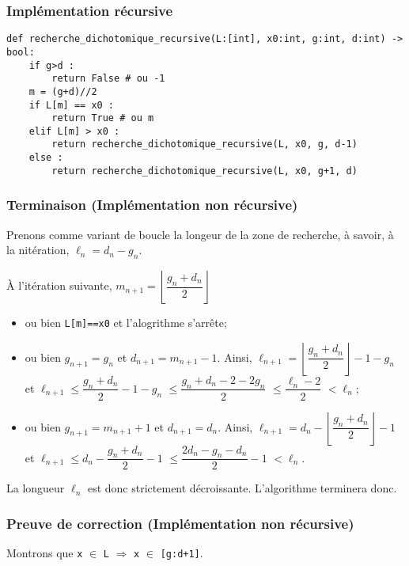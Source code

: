 \subsubsection{Implémentation récursive}
\begin{lstlisting}
def recherche_dichotomique_recursive(L:[int], x0:int, g:int, d:int) -> bool:
    if g>d : 
        return False # ou -1
    m = (g+d)//2
    if L[m] == x0 :
        return True # ou m
    elif L[m] > x0 :
        return recherche_dichotomique_recursive(L, x0, g, d-1)
    else :
        return recherche_dichotomique_recursive(L, x0, g+1, d)
\end{lstlisting} 


\subsubsection{Terminaison (Implémentation non récursive)}

Prenons comme variant de boucle la longeur de la zone de recherche, à savoir, à la n\ieme itération, 
$\ell_n = d_n - g_n$. 

À l'itération suivante, $ m_{n+1} =  \left\lfloor \dfrac{g_n+d_n}{2}  \right\rfloor$
\begin{itemize}
\item ou bien \lstinline{L[m]==x0} et l'alogrithme s'arrête;
\item ou bien  $g_{n+1} = g_n$ et $d_{n+1} = m_{n+1}-1$. Ainsi, $\ell_{n+1} =  \left\lfloor \dfrac{g_n+d_n}{2}  \right\rfloor-1 -  g_n$ et 
$\ell_{n+1} \leq   \dfrac{g_n+d_n}{2}  -1 -  g_n $ $ \leq   \dfrac{g_n+d_n - 2 - 2g_n }{2}  $ $ \leq   \dfrac{\ell_n- 2 }{2}  $  $< \ell_n$;
\item ou bien  $g_{n+1} =  m_{n+1}+1$ et $d_{n+1} = d_n$.
 Ainsi, $\ell_{n+1} =  d_n  - \left\lfloor \dfrac{g_n+d_n}{2}  \right\rfloor-1$ et 
$\ell_{n+1} \leq   d_n  -  \dfrac{g_n+d_n}{2}  -1 $  
$\leq   \dfrac{2 d_n - g_n - d_n}{2}  -1 $  
$< \ell_n $.
\end{itemize}

La longueur $\ell_n$ est donc strictement décroissante. L'algorithme terminera donc. 

\subsubsection{Preuve de correction (Implémentation non récursive)}

Montrons que \lstinline{x} $\in$ \lstinline{L} $\Rightarrow$ \lstinline{x} $\in$ \lstinline{[g:d+1]}.


